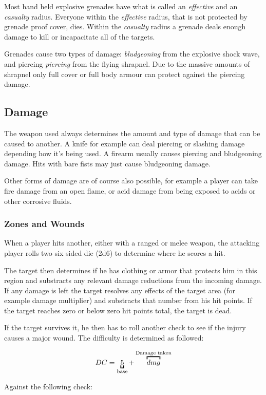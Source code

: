 Most hand held explosive grenades have what is called an \emph{effective} and
an \emph{casualty} radius. Everyone within the \emph{effective} radius, that is
not protected by grenade proof cover, dies. Within the \emph{casualty} radius
a grenade deals enough damage to kill or incapacitate all of the targets.

Grenades cause two types of damage: \emph{bludgeoning} from the explosive shock
wave, and piercing \emph{piercing} from the flying shrapnel. Due to the massive
amounts of shrapnel only full cover or full body armour can protect against the
piercing damage.

\subsection{Damage}

The weapon used always determines the amount and type of damage that can be
caused to another. A knife for example can deal piercing or slashing damage
depending how it's being used. A firearm usually causes piercing and
bludgeoning damage. Hits with bare fists may just cause bludgeoning damage.

Other forms of damage are of course also possible, for example a player can
take fire damage from an open flame, or acid damage from being exposed to
acids or other corrosive fluids.

\subsubsection{Zones and Wounds}

When a player hits another, either with a ranged or melee weapon, the attacking
player rolls two six sided die (2d6) to determine where he scores a hit.

The target then determines if he has clothing or armor that protects him in this
region and substracts any relevant damage reductions from the incoming damage.
If any damage is left the target resolves any effects of the target area (for
example damage multiplier) and substracts that number from his hit points. If
the target reaches zero or below zero hit points total, the target is dead.

If the target survives it, he then has to roll another check to see if the
injury causes a major wound. The difficulty is determined as followed:

\[
DC = \ub{5}{base} + \ob{dmg}{Damage taken}
\]

Against the following check:


